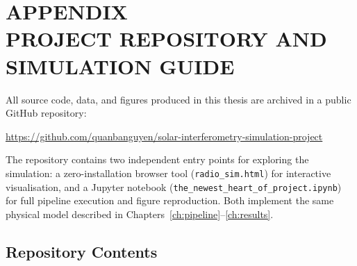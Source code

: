 \clearpage
{} %
\chapter*{APPENDIX\\[0.3em]PROJECT REPOSITORY AND SIMULATION GUIDE}
\setcounter{section}{0}
\renewcommand{\thesection}{A.\arabic{section}}
\setcounter{figure}{0}
\renewcommand{\thefigure}{A.\arabic{figure}}

All source code, data, and figures produced in this thesis are archived in a
public GitHub repository:

\begin{center}
  \large
  \url{https://github.com/quanbanguyen/solar-interferometry-simulation-project}
  \citep{github_repo}
\end{center}

\noindent
The repository contains two independent entry points for exploring the
simulation: a zero-installation browser tool (\texttt{radio\_sim.html}) for
interactive visualisation, and a Jupyter notebook
(\texttt{the\_newest\_heart\_of\_project.ipynb}) for full pipeline execution
and figure reproduction. Both implement the same physical model described in
Chapters~\ref{ch:pipeline}--\ref{ch:results}.

\section{Repository Contents}


